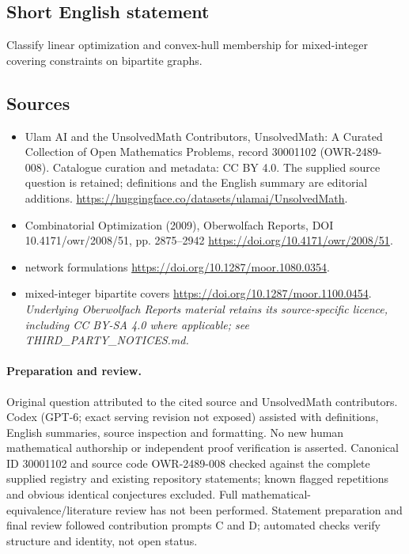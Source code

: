 \documentclass[11pt]{article}
\begin{document}
\subsection{Short English statement}
Classify linear optimization and convex-hull membership for mixed-integer covering constraints on bipartite graphs.
\subsection{Sources}
\begin{itemize}
\item[\hypertarget{source:30001102:1}{S1}] Ulam AI and the UnsolvedMath Contributors, UnsolvedMath: A Curated Collection of Open Mathematics Problems, record 30001102 (OWR-2489-008). Catalogue curation and metadata: CC BY 4.0. The supplied source question is retained; definitions and the English summary are editorial additions.
\url{https://huggingface.co/datasets/ulamai/UnsolvedMath}.
\item[\hypertarget{source:30001102:2}{S2}] Combinatorial Optimization (2009), Oberwolfach Reports, DOI 10.4171/owr/2008/51, pp. 2875--2942
\url{https://doi.org/10.4171/owr/2008/51}.
\item[\hypertarget{source:30001102:3}{S3}] network formulations
\url{https://doi.org/10.1287/moor.1080.0354}.
\item[\hypertarget{source:30001102:4}{S4}] mixed-integer bipartite covers
\url{https://doi.org/10.1287/moor.1100.0454}.
\textit{Underlying Oberwolfach Reports material retains its source-specific licence, including CC BY-SA 4.0 where applicable; see THIRD\_PARTY\_NOTICES.md.}
\end{itemize}
\paragraph{Preparation and review.}
Original question attributed to the cited source and UnsolvedMath contributors. Codex (GPT-6; exact serving revision not exposed) assisted with definitions, English summaries, source inspection and formatting. No new human mathematical authorship or independent proof verification is asserted. Canonical ID 30001102 and source code OWR-2489-008 checked against the complete supplied registry and existing repository statements; known flagged repetitions and obvious identical conjectures excluded. Full mathematical-equivalence/literature review has not been performed. Statement preparation and final review followed contribution prompts C and D; automated checks verify structure and identity, not open status.
\label{end:30001102}
\end{document}
